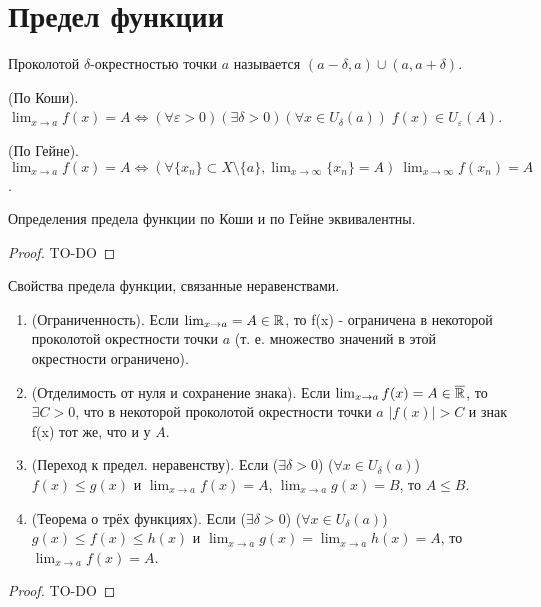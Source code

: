 \section{Предел функции}
\begin{definition}
	Проколотой $\delta$-окрестностью точки $a$ называется $(a - \delta, a) \cup (a, a + \delta)$.
\end{definition}

\begin{definition}
	(По Коши). $\lim_{x \to a} f(x) = A \Leftrightarrow (\forall \varepsilon > 0) (\exists \delta > 0) (\forall x \in U_\delta(a)) \; f(x) \in U_\varepsilon(A)$. 
\end{definition}

\begin{definition}
	(По Гейне). $\lim_{x \to a} f(x) = A \Leftrightarrow (\forall \{x_n\} \subset X \setminus \{a\}, \lim_{x \to \infty} \{x_n\} = A) \: \lim_{x \to \infty} f(x_n) = A$.
\end{definition}

\begin{theorem}
	Определения предела функции по Коши и по Гейне эквивалентны.
\end{theorem}
\begin{proof}
	TO-DO
\end{proof}

\begin{theorem}{Свойства предела функции, связанные неравенствами.}
	\begin{enumerate}
		\item (Ограниченность). Если $\lim_{x \to a} = A \in \mathbb{R}$, то f(x) - ограничена в некоторой проколотой окрестности точки $a$ (т. е. множество значений в этой окрестности ограничено).
		\item (Отделимость от нуля и сохранение знака). Если $\lim_{x \to a} f(x) = A \in \overline{\mathbb{R}}$, то $\exists C > 0$, что в некоторой проколотой окрестности точки $a$ $|f(x)| > C$ и знак f(x) тот же, что и у $A$.
		\item (Переход к предел. неравенству). Если ($\exists \delta > 0$) ($\forall x \in U_\delta(a)$) $f(x) \le g(x)$ и $\lim_{x \to a} f(x) = A$, $\lim_{x \to a} g(x) = B$, то $A \le B$.
		\item (Теорема о трёх функциях). Если ($\exists \delta > 0$) ($\forall x \in U_\delta(a)$) $g(x) \le f(x) \le h(x)$ и $\lim_{x \to a} g(x) = \lim_{x \to a} h(x) = A$, то $\lim_{x \to a} f(x) = A$.
	\end{enumerate}
\end{theorem}
\begin{proof}
	TO-DO
\end{proof}

